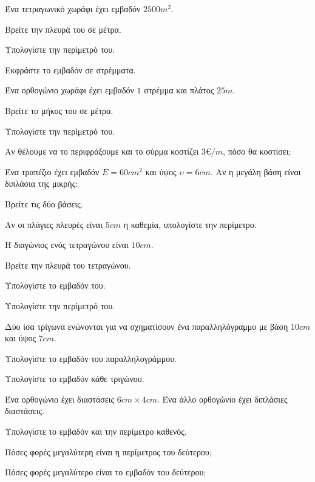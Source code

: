 \documentclass[11pt,a4paper,modern]{FFExercises}
\begin{document}
\askhsh Ένα τετραγωνικό χωράφι έχει εμβαδόν $2500\si{m^2}$.
\begin{alist}
\item Βρείτε την πλευρά του σε μέτρα.
\item Υπολογίστε την περίμετρό του.
\item Εκφράστε το εμβαδόν σε στρέμματα.
\end{alist}

\askhsh Ένα ορθογώνιο χωράφι έχει εμβαδόν $1$ στρέμμα και πλάτος $25\si{m}$.
\begin{alist}
\item Βρείτε το μήκος του σε μέτρα.
\item Υπολογίστε την περίμετρό του.
\item Αν θέλουμε να το περιφράξουμε και το σύρμα κοστίζει $3$\euro/$\si{m}$, πόσο θα κοστίσει;
\end{alist}

\askhsh Ένα τραπέζιο έχει εμβαδόν $E=60\si{cm^2}$ και ύψος $\upsilon=6\si{cm}$. Αν η μεγάλη βάση είναι διπλάσια της μικρής:
\begin{alist}
\item Βρείτε τις δύο βάσεις.
\item Αν οι πλάγιες πλευρές είναι $5\si{cm}$ η καθεμία, υπολογίστε την περίμετρο.
\end{alist}

\askhsh Η διαγώνιος ενός τετραγώνου είναι $10\si{cm}$.
\begin{alist}
\item Βρείτε την πλευρά του τετραγώνου.
\item Υπολογίστε το εμβαδόν του.
\item Υπολογίστε την περίμετρό του.
\end{alist}

\askhsh Δύο ίσα τρίγωνα ενώνονται για να σχηματίσουν ένα παραλληλόγραμμο με βάση $10\si{cm}$ και ύψος $7\si{cm}$.
\begin{alist}
\item Υπολογίστε το εμβαδόν του παραλληλογράμμου.
\item Υπολογίστε το εμβαδόν κάθε τριγώνου.
\end{alist}

\askhsh Ένα ορθογώνιο έχει διαστάσεις $6\si{cm}\times 4\si{cm}$. Ένα άλλο ορθογώνιο έχει διπλάσιες διαστάσεις.
\begin{alist}
\item Υπολογίστε το εμβαδόν και την περίμετρο καθενός.
\item Πόσες φορές μεγαλύτερη είναι η περίμετρος του δεύτερου;
\item Πόσες φορές μεγαλύτερο είναι το εμβαδόν του δεύτερου;
\end{alist}
\end{document}
